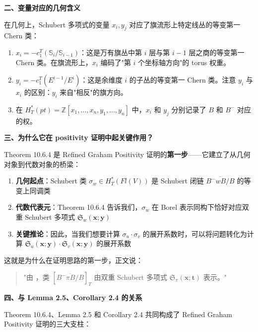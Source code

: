 \textbf{二、变量对应的几何含义}

在几何上，Schubert 多项式的变量 $x_i, y_j$ 对应了旗流形上特定线丛的等变第一 Chern 类：

\begin{enumerate}
\item $x_i = -c_1^T(\mathbb{S}_i / \mathbb{S}_{i-1})$：这是万有旗丛中第 $i$ 层与第 $i-1$ 层之商的等变第一 Chern 类。在旗流形上，$x_i$ 编码了"第 $i$ 个坐标轴方向"的 torus 权重。

\item $y_i = -c_1^T(E^{i-1} / E^i)$：这是余维度 $i$ 的子丛的等变第一 Chern 类。注意 $y_i$ 与 $x_i$ 的区别：$y_i$ 来自"相反"的旗方向。

\item 在 $H_T^*(pt) = \mathbb{Z}[x_1, \ldots, x_n, y_1, \ldots, y_n]$ 中，$x_i$ 和 $y_j$ 分别记录了 $B$ 和 $B^-$ 对应的权。
\end{enumerate}

\textbf{三、为什么它在 positivity 证明中起关键作用？}

Theorem 10.6.4 是 Refined Graham Positivity 证明的\textbf{第一步}——它建立了从几何对象到代数对象的桥梁：

\begin{enumerate}
\item \textbf{几何起点}：Schubert 类 $\sigma_w \in H_T^*(Fl(V))$ 是 Schubert 闭链 $\overline{B^-wB/B}$ 的等变上同调类

\item \textbf{代数代表元}：Theorem 10.6.4 告诉我们，$\sigma_w$ 在 Borel 表示同构下恰好对应双重 Schubert 多项式 $\mathfrak{S}_w(\mathbf{x}; \mathbf{y})$

\item \textbf{关键推论}：因此，当我们想要计算 $\sigma_u \cdot \sigma_v$ 的展开系数时，可以将问题转化为计算 $\mathfrak{S}_u(\mathbf{x}; \mathbf{y}) \cdot \mathfrak{S}_v(\mathbf{x}; \mathbf{y})$ 的展开系数
\end{enumerate}

这就是为什么在证明思路的第一步，正文说：
\begin{quote}
"由 \cite[Theororem 10.6.4]{anderson2023}，类 $[\overline{B^-\pi B/B}]_T$ 由双重 Schubert 多项式 $\mathfrak{S}_\pi(\mathbf{x}; \mathbf{t})$ 表示。"
\end{quote}

\textbf{四、与 Lemma 2.5、Corollary 2.4 的关系}

Theorem 10.6.4、Lemma 2.5 和 Corollary 2.4 共同构成了 Refined Graham Positivity 证明的三大支柱：


